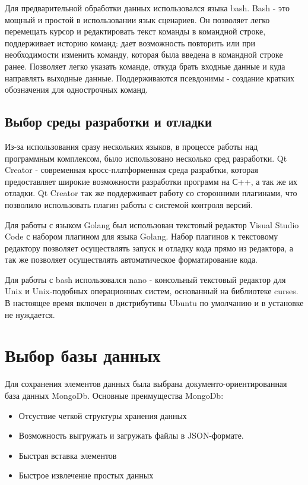 Для предварительной обработки данных использовался языка bash. Bash - это мощный и простой в использовании язык сценариев. Он позволяет 	 легко перемещать курсор и редактировать текст команды в командной строке, поддерживает историю команд: дает возможность повторить или при необходимости изменить команду, которая была введена в командной строке ранее. Позволяет легко указать команде, откуда брать входные данные и куда направлять выходные данные. Поддерживаются псевдонимы - создание кратких обозначения для однострочных команд.

\subsection{Выбор среды разработки и отладки}
Из-за использования сразу нескольких языков, в процессе работы над программным комплексом, было использовано несколько сред разработки.
Qt Creator - современная кросс-платформенная среда разрабтки, которая предоставляет широкие возможности разработки программ на С++, а так же их отладки. Qt Creator так же поддерживает работу со сторонними плагинами, что позволило использовать плагин работы с системой контроля версий.

Для работы с языком Golang был использован текстовый редактор Visual Studio Code с набором плагином для языка Golang. Набор плагинов к текстовому редактору позволяет осуществлять запуск и отладку кода прямо из редактора, а так же позволяет осуществлять автоматическое форматирование кода.

Для работы с bash использовался nano - консольный текстовый редактор для Unix и Unix-подобных операционных систем, основанный на библиотеке curses. В настоящее время включен в дистрибутивы Ubuntu по умолчанию и в установке не нуждается.
\section{Выбор базы данных}
Для сохранения элементов данных была выбрана документо-ориентированная база данных MongoDb. Основные преимущества MongoDb:
\begin{itemize}
	\item Отсуствие четкой структуры хранения данных
	\item Возможность выгружать и загружать файлы в JSON-формате.
	\item Быстрая вставка элементов
	\item Быстрое извлечение простых данных
\end{itemize}
